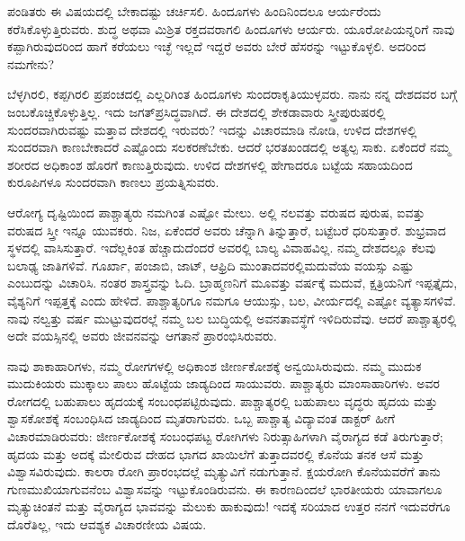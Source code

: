 ಪಂಡಿತರು ಈ ವಿಷಯದಲ್ಲಿ ಬೇಕಾದಷ್ಟು ಚರ್ಚಿಸಲಿ. ಹಿಂದೂಗಳು ಹಿಂದಿನಿಂದಲೂ ಆರ್ಯರೆಂದು ಕರೆಸಿಕೊಳ್ಳುತ್ತಿರುವರು. ಶುದ್ಧ ಅಥವಾ ಮಿಶ್ರಿತ ರಕ್ತದವರಾಗಲಿ ಹಿಂದೂಗಳು ಆರ್ಯರು. ಯೂರೋಪಿಯನ್ನರಿಗೆ ನಾವು ಕಪ್ಪಾಗಿರುವುದರಿಂದ ಹಾಗೆ ಕರೆಯಲು ಇಚ್ಛೆ ಇಲ್ಲದೆ ಇದ್ದರೆ ಅವರು ಬೇರೆ ಹೆಸರನ್ನು ಇಟ್ಟುಕೊಳ್ಳಲಿ. ಅದರಿಂದ ನಮಗೇನು?

ಬೆಳ್ಳಗಿರಲಿ, ಕಪ್ಪಗಿರಲಿ ಪ್ರಪಂಚದಲ್ಲಿ ಎಲ್ಲರಿಗಿಂತ ಹಿಂದೂಗಳು ಸುಂದರಾಕೃತಿಯುಳ್ಳ\break ವರು. ನಾನು ನನ್ನ ದೇಶದವರ ಬಗ್ಗೆ ಜಂಬಕೊಚ್ಚಿಕೊಳ್ಳುತ್ತಿಲ್ಲ. ಇದು ಜಗತ್​ಪ್ರಸಿದ್ಧವಾಗಿದೆ. ಈ ದೇಶದಲ್ಲಿ ಶೇಕಡಾವಾರು ಸ್ತ್ರೀಪುರುಷರಲ್ಲಿ ಸುಂದರವಾಗಿರುವಷ್ಟು ಮತ್ತಾವ ದೇಶದಲ್ಲಿ ಇರುವರು? ಇದನ್ನು ವಿಚಾರಮಾಡಿ ನೋಡಿ, ಉಳಿದ ದೇಶಗಳಲ್ಲಿ ಸುಂದರವಾಗಿ ಕಾಣಬೇಕಾದರೆ ಎಷ್ಟೊಂದು ಸಲಕರಣೆಬೇಕು. ಆದರೆ ಭರತಖಂಡದಲ್ಲಿ ಅತ್ಯಲ್ಪ ಸಾಕು. ಏಕೆಂದರೆ ನಮ್ಮ ಶರೀರದ ಅಧಿಕಾಂಶ ಹೊರಗೆ ಕಾಣುತ್ತಿರುವುದು. ಉಳಿದ ದೇಶಗಳಲ್ಲಿ ಹೇಗಾದರೂ ಬಟ್ಟೆಯ ಸಹಾಯದಿಂದ ಕುರೂಪಿಗಳೂ ಸುಂದರವಾಗಿ ಕಾಣಲು ಪ್ರಯತ್ನಿಸುವರು.

ಆರೋಗ್ಯ ದೃಷ್ಟಿಯಿಂದ ಪಾಶ್ಚಾತ್ಯರು ನಮಗಿಂತ ಎಷ್ಟೋ ಮೇಲು. ಅಲ್ಲಿ ನಲವತ್ತು ವರುಷದ ಪುರುಷ, ಐವತ್ತು ವರುಷದ ಸ್ತ್ರೀ ಇನ್ನೂ ಯುವಕರು. ನಿಜ, ಏಕೆಂದರೆ ಅವರು ಚೆನ್ನಾಗಿ ತಿನ್ನುತ್ತಾರೆ, ಬಟ್ಟೆಬರೆ ಧರಿಸುತ್ತಾರೆ. ಶುಭ್ರವಾದ ಸ್ಥಳದಲ್ಲಿ ವಾಸಿಸುತ್ತಾರೆ. ಇದೆಲ್ಲಕಿಂತ ಹೆಚ್ಚಾದುದೆಂದರೆ ಅವರಲ್ಲಿ ಬಾಲ್ಯ ವಿವಾಹವಿಲ್ಲ. ನಮ್ಮ ದೇಶದಲ್ಲೂ ಕೆಲವು ಬಲಾಢ್ಯ ಜಾತಿಗಳಿವೆ. ಗೂರ್ಖಾ, ಪಂಜಾಬಿ, ಜಾಟ್​, ಆಫ್ರಿದಿ ಮುಂತಾದವರಲ್ಲಿ\break ಮದುವೆಯ ವಯಸ್ಸು ಎಷ್ಟು ಎಂಬುದನ್ನು ವಿಚಾರಿಸಿ. ನಂತರ ಶಾಸ್ತ್ರವನ್ನು ಓದಿ. ಬ್ರಾಹ್ಮಣನಿಗೆ ಮೂವತ್ತು ವರ್ಷಕ್ಕೆ ಮದುವೆ, ಕ್ಷತ್ರಿಯನಿಗೆ ಇಪ್ಪತ್ತೈದು, ವೈಶ್ಯನಿಗೆ ಇಪ್ಪತ್ತಕ್ಕೆ ಎಂದು ಹೇಳಿದೆ. ಪಾಶ್ಚಾತ್ಯರಿಗೂ ನಮಗೂ ಆಯುಸ್ಸು, ಬಲ, ವೀರ್ಯದಲ್ಲಿ ಎಷ್ಟೋ ವ್ಯತ್ಯಾಸಗಳಿವೆ. ನಾವು ನಲ್ವತ್ತು ವರ್ಷ ಮುಟ್ಟುವುದರಲ್ಲೆ ನಮ್ಮ ಬಲ ಬುದ್ಧಿಯಲ್ಲಿ ಅವನತಾವಸ್ಥೆಗೆ ಇಳಿದಿರುವೆವು. ಆದರೆ ಪಾಶ್ಚಾತ್ಯರಲ್ಲಿ ಅದೇ ವಯಸ್ಸಿನಲ್ಲಿ ಅವರು ಜೀವನವನ್ನು ಆಗತಾನೆ ಪ್ರಾರಂಭಿಸಿರುವರು.

ನಾವು ಶಾಕಾಹಾರಿಗಳು, ನಮ್ಮ ರೋಗಗಳಲ್ಲಿ ಅಧಿಕಾಂಶ ಜೀರ್ಣಕೋಶಕ್ಕೆ ಅನ್ವಯಿಸಿರು\break ವುದು. ನಮ್ಮ ಮುದುಕ ಮುದುಕಿಯರು ಮುಕ್ಕಾಲು ಪಾಲು ಹೊಟ್ಟೆಯ ಜಾಡ್ಯದಿಂದ ಸಾಯುವರು. ಪಾಶ್ಚಾತ್ಯರು ಮಾಂಸಾಹಾರಿಗಳು. ಅವರ ರೋಗದಲ್ಲಿ ಬಹುಪಾಲು ಹೃದಯಕ್ಕೆ ಸಂಬಂಧಪಟ್ಟಿರುವುದು. ಪಾಶ್ಚಾತ್ಯರಲ್ಲಿ ಬಹುಪಾಲು ವೃದ್ಧರು ಹೃದಯ ಮತ್ತು ಶ್ವಾಸಕೋಶಕ್ಕೆ ಸಂಬಂಧಿಸಿದ ಜಾಡ್ಯದಿಂದ ಮೃತರಾಗುವರು. ಒಬ್ಬ ಪಾಶ್ಚಾತ್ಯ ವಿದ್ಯಾವಂತ ಡಾಕ್ಟರ್​ ಹೀಗೆ ವಿಚಾರಮಾಡಿರುವರು: ಜೀರ್ಣಕೋಶಕ್ಕೆ ಸಂಬಂಧಪಟ್ಟ ರೋಗಿಗಳು ನಿರುತ್ಸಾಹಿಗಳಾಗಿ ವೈರಾಗ್ಯದ ಕಡೆ ತಿರುಗುತ್ತಾರೆ; ಹೃದಯ ಮತ್ತು ಅದಕ್ಕೆ ಮೇಲಿರುವ ದೇಹದ ಭಾಗದ ಖಾಯಿಲೆಗೆ ತುತ್ತಾದವರಲ್ಲಿ ಕೊನೆಯ ತನಕ ಆಸೆ ಮತ್ತು ವಿಶ್ವಾಸವಿರುವುದು. ಕಾಲರಾ ರೋಗಿ ಪ್ರಾರಂಭದಲ್ಲೆ ಮೃತ್ಯುವಿಗೆ ನಡುಗುತ್ತಾನೆ. ಕ್ಷಯರೋಗಿ ಕೊನೆಯವರೆಗೆ ತಾನು ಗುಣಮುಖಿಯಾಗುವನೆಂಬ ವಿಶ್ವಾಸವನ್ನು ಇಟ್ಟುಕೊಂಡಿರುವನು. ಈ ಕಾರಣದಿಂದಲೆ ಭಾರತೀಯರು ಯಾವಾಗಲೂ ಮೃತ್ಯುಚಿಂತನೆ ಮತ್ತು ವೈರಾಗ್ಯದ ಭಾವವನ್ನು ಮೆಲುಕು ಹಾಕುವುದು! ಇದಕ್ಕೆ ಸರಿಯಾದ ಉತ್ತರ ನನಗೆ ಇದುವರೆಗೂ ದೊರೆತಿಲ್ಲ, ಇದು ಆವಶ್ಯಕ ವಿಚಾರಣೀಯ ವಿಷಯ.

